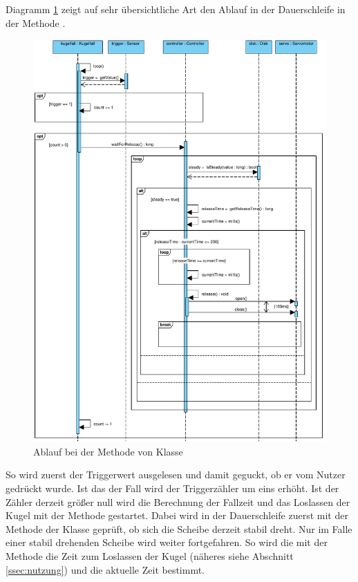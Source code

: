 Diagramm \ref{fig:loop_diagram} zeigt auf sehr übersichtliche Art den Ablauf in der Dauerschleife in der Methode .
\begin{figure}[htbp]
	\centering
	\includegraphics[width=\textwidth]{abb/loop_cropped}
	\caption{Ablauf bei der Methode  von Klasse }
	\label{fig:loop_diagram}
\end{figure}
So wird zuerst der Triggerwert ausgelesen und damit geguckt, ob er vom Nutzer gedrückt wurde.
Ist das der Fall wird der Triggerzähler um eins erhöht.
Ist der Zähler derzeit größer null wird die Berechnung der Fallzeit und das Loslassen der Kugel mit der Methode  gestartet.
Dabei wird in der Dauerschleife zuerst mit der Methode  der Klasse  geprüft, ob sich die Scheibe derzeit stabil dreht.
Nur im Falle einer stabil drehenden Scheibe wird weiter fortgefahren.
So wird die mit der Methode  die Zeit zum Loslassen der Kugel (näheres siehe Abschnitt \ref{ssec:nutzung}) und die aktuelle Zeit bestimmt.
